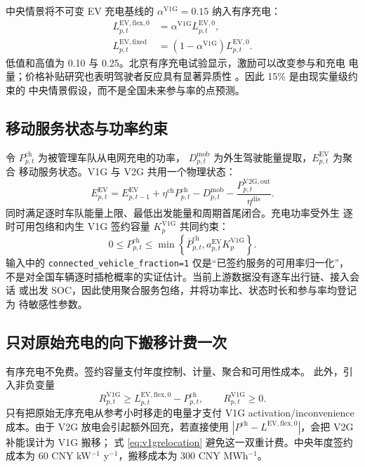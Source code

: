 \documentclass[UTF8,fontset=fandol,12pt]{ctexart}
\newcommand{\code}[1]{\nolinkurl{#1}}
\begin{document}
中央情景将不可变 EV 充电基线的 $\alpha^{\mathrm{V1G}}=0.15$ 纳入有序充电：
\begin{align}
  L^{\mathrm{EV,flex},0}_{p,t}
  &=\alpha^{\mathrm{V1G}}L^{\mathrm{EV},0}_{p,t},\\
  L^{\mathrm{EV,fixed}}_{p,t}
  &=(1-\alpha^{\mathrm{V1G}})L^{\mathrm{EV},0}_{p,t}.
\end{align}
低值和高值为 0.10 与 0.25。北京有序充电试验显示，激励可以改变参与和充电
电量；价格补贴研究也表明驾驶者反应具有显著异质性
\cite{Liu2021OrderlyCharging,Zhao2026Charging}。因此 15\% 是由现实量级约束的
中央情景假设，而不是全国未来参与率的点预测。

\subsection{移动服务状态与功率约束}

令 $P^{\mathrm{ch}}_{p,t}$ 为被管理车队从电网充电的功率，
$D^{\mathrm{mob}}_{p,t}$ 为外生驾驶能量提取，$E^{\mathrm{EV}}_{p,t}$ 为聚合
移动服务状态。V1G 与 V2G 共用一个物理状态：
\begin{equation}
  E^{\mathrm{EV}}_{p,t}
  =
  E^{\mathrm{EV}}_{p,t-1}
  +\eta^{\mathrm{ch}}P^{\mathrm{ch}}_{p,t}
  -D^{\mathrm{mob}}_{p,t}
  -\frac{P^{\mathrm{V2G,out}}_{p,t}}{\eta^{\mathrm{dis}}}.
  \label{eq:evstate}
\end{equation}
同时满足逐时车队能量上限、最低出发能量和周期首尾闭合。充电功率受外生
逐时可用包络和内生 V1G 签约容量 $K^{\mathrm{V1G}}_p$ 共同约束：
\begin{equation}
  0\le P^{\mathrm{ch}}_{p,t}
  \le
  \min\left\{
    \overline P^{\mathrm{ch}}_{p,t},
    a^{\mathrm{EV}}_{p,t}K^{\mathrm{V1G}}_p
  \right\}.
\end{equation}
输入中的 \code{connected_vehicle_fraction=1} 仅是``已签约服务的可用率归一化''，
不是对全国车辆逐时插枪概率的实证估计。当前上游数据没有逐车出行链、接入会话
或出发 SOC，因此使用聚合服务包络，并将功率比、状态时长和参与率均登记为
待敏感性参数。

\subsection{只对原始充电的向下搬移计费一次}

有序充电不免费。签约容量支付年度控制、计量、聚合和可用性成本。
此外，引入非负变量
\begin{equation}
  R^{\mathrm{V1G}}_{p,t}
  \ge
  L^{\mathrm{EV,flex},0}_{p,t}
  -P^{\mathrm{ch}}_{p,t},
  \qquad
  R^{\mathrm{V1G}}_{p,t}\ge0.
  \label{eq:v1grelocation}
\end{equation}
只有把原始无序充电从参考小时移走的电量才支付 V1G activation/inconvenience
成本。由于 V2G 放电会引起额外回充，若直接使用
$|P^{\mathrm{ch}}-L^{\mathrm{EV,flex},0}|$，会把 V2G 补能误计为 V1G 搬移；
式 \eqref{eq:v1grelocation} 避免这一双重计费。中央年度签约成本为
60 CNY kW$^{-1}$ y$^{-1}$，搬移成本为 300 CNY MWh$^{-1}$。
\end{document}
